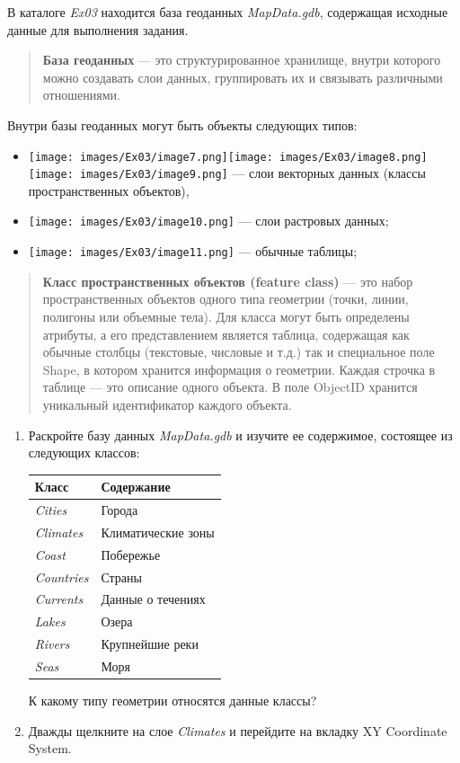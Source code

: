 \documentclass[12pt,]{book}
\providecommand{\tightlist}{%
  \setlength{\itemsep}{0pt}\setlength{\parskip}{0pt}}
\begin{document}
В каталоге \emph{Ex03} находится база геоданных \emph{MapData.gdb}, содержащая
исходные данные для выполнения задания.

\begin{quote}
\textbf{База геоданных} --- это структурированное хранилище, внутри которого
можно создавать слои данных, группировать их и связывать различными
отношениями.
\end{quote}

Внутри базы геоданных могут быть объекты следующих типов:

\begin{itemize}
\tightlist
\item
  \texttt{[image: images/Ex03/image7.png]}\texttt{[image: images/Ex03/image8.png]}\texttt{[image: images/Ex03/image9.png]} --- слои векторных данных (классы пространственных объектов),
\item
  \texttt{[image: images/Ex03/image10.png]} --- слои растровых данных;
\item
  \texttt{[image: images/Ex03/image11.png]} --- обычные таблицы;
\end{itemize}

\begin{quote}
\textbf{Класс пространственных объектов (feature class)} --- это набор
пространственных объектов одного типа геометрии (точки, линии, полигоны
или объемные тела). Для класса могут быть определены атрибуты, а его
представлением является таблица, содержащая как обычные столбцы
(текстовые, числовые и т.д.) так и специальное поле Shape, в котором
хранится информация о геометрии. Каждая строчка в таблице --- это описание
одного объекта. В поле ObjectID хранится уникальный идентификатор каждого объекта.
\end{quote}

\begin{enumerate}
\def\labelenumi{\arabic{enumi}.}
\setcounter{enumi}{2}
\item
  Раскройте базу данных \emph{MapData.gdb} и изучите ее содержимое, состоящее из следующих классов:

  \begin{longtable}[]{@{}ll@{}}
  \toprule
  \textbf{Класс} & \textbf{Содержание}\tabularnewline
  \midrule
  \endhead
  \emph{Cities} & Города\tabularnewline
  \emph{Climates} & Климатические зоны\tabularnewline
  \emph{Coast} & Побережье\tabularnewline
  \emph{Countries} & Страны\tabularnewline
  \emph{Currents} & Данные о течениях\tabularnewline
  \emph{Lakes} & Озера\tabularnewline
  \emph{Rivers} & Крупнейшие реки\tabularnewline
  \emph{Seas} & Моря\tabularnewline
  \bottomrule
  \end{longtable}

  К какому типу геометрии относятся данные классы?
\item
  Дважды щелкните на слое \emph{Climates} и перейдите на вкладку XY Coordinate System.
\end{enumerate}
\end{document}
